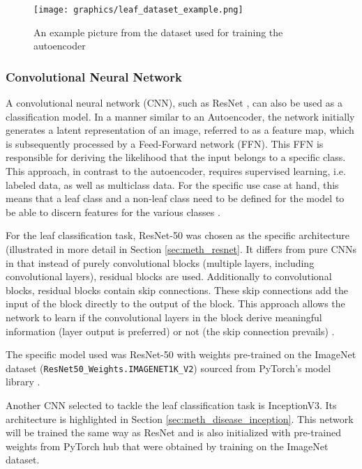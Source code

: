 \documentclass[draft,final]{vutinfth} %
\begin{document}
\begin{figure}
    \centering
    \texttt{[image: graphics/leaf\_dataset\_example.png]}
    \caption{An example picture from the dataset used for training the autoencoder}
    \label{fig:leaf_example}
\end{figure}

\subsubsection{Convolutional Neural Network}
A convolutional neural network (CNN), such as ResNet \cite{he_deep_2015}, can also be used as a classification model. In a manner similar to an Autoencoder, the network initially generates a latent representation of an image, referred to as a feature map, which is subsequently processed by a Feed-Forward network (FFN). This FFN is responsible for deriving the likelihood that the input belongs to a specific class. This approach, in contrast to the autoencoder, requires supervised learning, i.e. labeled data, as well as multiclass data. For the specific use case at hand, this means that a leaf class and a non-leaf class need to be defined for the model to be able to discern features for the various classes \cite{he_deep_2015}.

For the leaf classification task, ResNet-50 was chosen as the specific architecture (illustrated in more detail in Section \ref{sec:meth_resnet}. It differs from pure CNNs in that instead of purely convolutional blocks (multiple layers, including convolutional layers), residual blocks are used. Additionally to convolutional blocks, residual blocks contain skip connections. These skip connections add the input of the block directly to the output of the block. This approach allows the network to learn if the convolutional layers in the block derive meaningful information (layer output is preferred) or not (the skip connection prevails) \cite{he_deep_2015, choudhary_comprehensive_2023}.

The specific model used was ResNet-50 with weights pre-trained on the ImageNet dataset \cite{deng_imagenet_2009} (\verb |ResNet50_Weights.IMAGENET1K_V2|) sourced from PyTorch's model library \cite{paszke_pytorch_2019}. 

Another CNN selected to tackle the leaf classification task is InceptionV3. Its architecture is highlighted in Section \ref{sec:meth_disease_inception}. This network will be trained the same way as ResNet and is also initialized with pre-trained weights from PyTorch hub \cite{paszke_pytorch_2019} that were obtained by training on the ImageNet \cite{deng_imagenet_2009} dataset.
\end{document}
